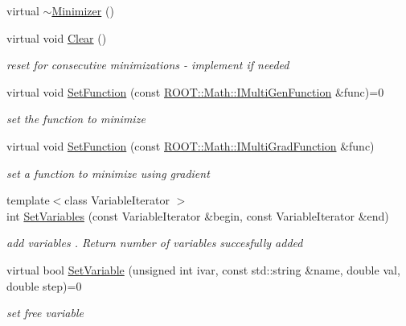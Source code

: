 \begin{DoxyCompactItemize}
\item 
virtual \mbox{\hyperlink{classROOT_1_1Math_1_1Minimizer_aa1045455fe657956659bfa7a21ce447e}{$\sim$\+Minimizer}} ()
\item 
virtual void \mbox{\hyperlink{classROOT_1_1Math_1_1Minimizer_ad7308846baecf68fb0dbc2d5e4caa178}{Clear}} ()
\begin{DoxyCompactList}\small\item\em reset for consecutive minimizations -\/ implement if needed \end{DoxyCompactList}\item 
virtual void \mbox{\hyperlink{classROOT_1_1Math_1_1Minimizer_a4391c613ab0c3f9777e56b487ffa5eac}{Set\+Function}} (const \mbox{\hyperlink{namespaceROOT_1_1Math_aec22897f3d759f7c284893c81d980799}{R\+O\+O\+T\+::\+Math\+::\+I\+Multi\+Gen\+Function}} \&func)=0
\begin{DoxyCompactList}\small\item\em set the function to minimize \end{DoxyCompactList}\item 
virtual void \mbox{\hyperlink{classROOT_1_1Math_1_1Minimizer_a1d9ff15aa732e518a60a05dcbd82c34a}{Set\+Function}} (const \mbox{\hyperlink{namespaceROOT_1_1Math_a014e019aaf9304a00e9231bd9ed232fb}{R\+O\+O\+T\+::\+Math\+::\+I\+Multi\+Grad\+Function}} \&func)
\begin{DoxyCompactList}\small\item\em set a function to minimize using gradient \end{DoxyCompactList}\item 
{\footnotesize template$<$class Variable\+Iterator $>$ }\\int \mbox{\hyperlink{classROOT_1_1Math_1_1Minimizer_a314040274ee907fba52726275a28c9f7}{Set\+Variables}} (const Variable\+Iterator \&begin, const Variable\+Iterator \&end)
\begin{DoxyCompactList}\small\item\em add variables . Return number of variables succesfully added \end{DoxyCompactList}\item 
virtual bool \mbox{\hyperlink{classROOT_1_1Math_1_1Minimizer_a8661a2ac86372602f32f97b3d9262421}{Set\+Variable}} (unsigned int ivar, const std\+::string \&name, double val, double step)=0
\begin{DoxyCompactList}\small\item\em set free variable \end{DoxyCompactList}\item 

\end{DoxyCompactItemize}
